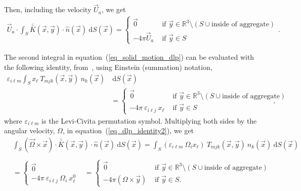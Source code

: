 Then, including the velocity $\vec{U}_a$, we get
\begin{align}
	\vec{U}_a \cdot
	\int_S  \bar{\bar{K}}(\vec{x},\vec{y}) \cdot \hat{n} ( \vec{x})
	\ \text{d}S(\vec{x})
	=
	 \begin{cases}
	 \vec{0}& \text{ if } \vec{y} \in \mathbb{R}^3  \setminus \left( S \cup {\text{inside of aggregate}}\right) 	\\ 
	 - 4\pi \vec{U}_a  & \text{ if } \vec{y} \in S 
	 \end{cases}.
	\label{eq_dlp_Ua}
\end{align}
\par 
The second integral in equation~(\ref{eq_solid_motion_dlp}) can be evaluated with the following identity, from~\cite{pozrikidis_boundary_1992},
using Einstein (summation) notation, 
\begin{align}
	\varepsilon_{i \ell m}
	 \int_S x_{\ell} \ T_{mjk}(\vec{x},\vec{y})  \ n_{k} ( \vec{x})
	& \ \text{d}S(\vec{x})
	\nonumber \\
	 & = 
	 \begin{cases}
	  \vec{0}
	  & \text{ if } \vec{y} \in \mathbb{R}^3  \setminus  	\left( S \cup {\text{inside of aggregate}}\right) \\ 
	 - 4\pi \ \varepsilon_{i \ell j} \ x_{\ell}
	 & \text{ if } \vec{y} \in S 
	 \end{cases},
	\label{eq_dlp_identity2}
\end{align}
where $\varepsilon_{i \ell m}$ is the Levi-Civita permutation symbol.  
Multiplying both sides by the angular velocity, $\Omega$, in equation~(\ref{eq_dlp_identity2}), we get 
\begin{align}
	&
	\int_S
	\left( \vec{\Omega} \times \vec{x} \right)
	 \cdot  \bar{\bar{K}}(\vec{x},\vec{y})  
	\cdot \hat{n} ( \vec{x})
	\ \text{d}S(\vec{x})
	 = 
	\int_S 
	\left(  \varepsilon_{i \ell m} \ \Omega_{i} x_{\ell} \right) \ 	T_{mjk}(\vec{x},\vec{y})  \ n_{k} ( \vec{x})
	\ \text{d}S(\vec{x})
	\nonumber \\
	\nonumber \\
 	& = 
 	\begin{cases}
 	  \vec{0}
 	 &  \\ 
 	- 4\pi \ \varepsilon_{i \ell j}\  \Omega_{i} \ x^0_{\ell}
 	& 
 	\end{cases}
	= \begin{cases}
 	  \vec{0}
 	 & \text{ if } \vec{y} \in \mathbb{R}^3  \setminus  
	 \left( S \cup {\text{inside of aggregate}}\right)
	  \\ 
 	- 4\pi \left(  \Omega \times \vec{y} \right)
 	& \text{ if } \vec{y} \in S.
 	\end{cases}
	\label{eq_dlp_Omega}
\end{align}
